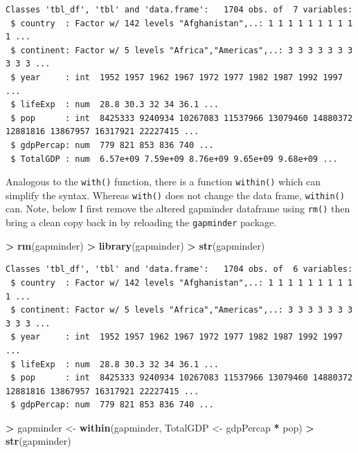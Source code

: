 \documentclass[]{krantz}
\makeatletter
\newenvironment{Shaded}{\begin{snugshade}}{\end{snugshade}}
\newcommand{\KeywordTok}[1]{\textcolor[rgb]{0.27,0.27,0.27}{\textbf{#1}}}
\newcommand{\NormalTok}[1]{#1}
\newcommand{\OperatorTok}[1]{\textcolor[rgb]{0.43,0.43,0.43}{\textbf{#1}}}
\newcommand{\StringTok}[1]{\textcolor[rgb]{0.5,0.5,0.5}{#1}}
\newenvironment{kframe}{%
\medskip{}
\setlength{\fboxsep}{.8em}
 \def\at@end@of@kframe{}%
 \ifinner\ifhmode%
  \def\at@end@of@kframe{\end{minipage}}%
  \begin{minipage}{\columnwidth}%
 \fi\fi%
 \def\FrameCommand##1{\hskip\@totalleftmargin \hskip-\fboxsep
 \colorbox{shadecolor}{##1}\hskip-\fboxsep
     \hskip-\linewidth \hskip-\@totalleftmargin \hskip\columnwidth}%
 \MakeFramed {\advance\hsize-\width
   \@totalleftmargin\z@ \linewidth\hsize
   \@setminipage}}%
 {\par\unskip\endMakeFramed%
 \at@end@of@kframe}
\renewenvironment{Shaded}{\begin{kframe}}{\end{kframe}}
\makeatother
\begin{document}
\begin{verbatim}
Classes 'tbl_df', 'tbl' and 'data.frame':   1704 obs. of  7 variables:
 $ country  : Factor w/ 142 levels "Afghanistan",..: 1 1 1 1 1 1 1 1 1 1 ...
 $ continent: Factor w/ 5 levels "Africa","Americas",..: 3 3 3 3 3 3 3 3 3 3 ...
 $ year     : int  1952 1957 1962 1967 1972 1977 1982 1987 1992 1997 ...
 $ lifeExp  : num  28.8 30.3 32 34 36.1 ...
 $ pop      : int  8425333 9240934 10267083 11537966 13079460 14880372 12881816 13867957 16317921 22227415 ...
 $ gdpPercap: num  779 821 853 836 740 ...
 $ TotalGDP : num  6.57e+09 7.59e+09 8.76e+09 9.65e+09 9.68e+09 ...
\end{verbatim}

Analogous to the \texttt{with()} function, there is a function \texttt{within()} which can simplify the syntax. Whereas \texttt{with()} does not change the data frame, \texttt{within()} can. Note, below I first remove the altered gapminder dataframe using \texttt{rm()} then bring a clean copy back in by reloading the \texttt{gapminder} package.

\begin{Shaded}
\begin{Highlighting}[]
\OperatorTok{>}\StringTok{ }\KeywordTok{rm}\NormalTok{(gapminder)}
\OperatorTok{>}\StringTok{ }\KeywordTok{library}\NormalTok{(gapminder)}
\OperatorTok{>}\StringTok{ }\KeywordTok{str}\NormalTok{(gapminder)}
\end{Highlighting}
\end{Shaded}

\begin{verbatim}
Classes 'tbl_df', 'tbl' and 'data.frame':   1704 obs. of  6 variables:
 $ country  : Factor w/ 142 levels "Afghanistan",..: 1 1 1 1 1 1 1 1 1 1 ...
 $ continent: Factor w/ 5 levels "Africa","Americas",..: 3 3 3 3 3 3 3 3 3 3 ...
 $ year     : int  1952 1957 1962 1967 1972 1977 1982 1987 1992 1997 ...
 $ lifeExp  : num  28.8 30.3 32 34 36.1 ...
 $ pop      : int  8425333 9240934 10267083 11537966 13079460 14880372 12881816 13867957 16317921 22227415 ...
 $ gdpPercap: num  779 821 853 836 740 ...
\end{verbatim}

\begin{Shaded}
\begin{Highlighting}[]
\OperatorTok{>}\StringTok{ }\NormalTok{gapminder <-}\StringTok{ }\KeywordTok{within}\NormalTok{(gapminder, TotalGDP <-}\StringTok{ }\NormalTok{gdpPercap }\OperatorTok{*}\StringTok{ }\NormalTok{pop)}
\OperatorTok{>}\StringTok{ }\KeywordTok{str}\NormalTok{(gapminder)}
\end{Highlighting}
\end{Shaded}
\end{document}
